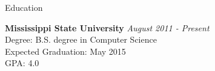 \documentclass{resume} %
\begin{document}






\begin{rSection}{Education}

	{\bf Mississippi State University} \hfill {\em August 2011 - Present} \\ 
	Degree: B.S. degree in Computer Science \\
	Expected Graduation: May 2015 \\
	GPA: 4.0

\end{rSection}


\end{document}
